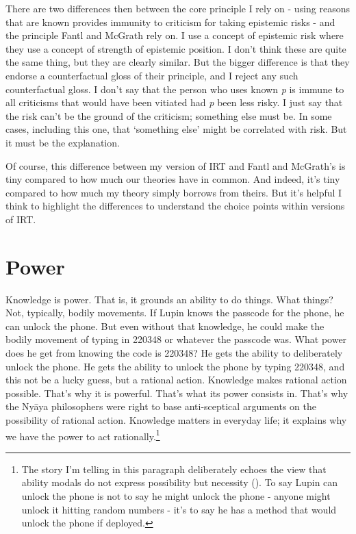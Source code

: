 \documentclass[
  12pt,
  letterpaper,
]{scrbook}
\begin{document}
There are two differences then between the core principle I rely on -
using reasons that are known provides immunity to criticism for taking
epistemic risks - and the principle Fantl and McGrath rely on. I use a
concept of epistemic risk where they use a concept of strength of
epistemic position. I don't think these are quite the same thing, but
they are clearly similar. But the bigger difference is that they endorse
a counterfactual gloss of their principle, and I reject any such
counterfactual gloss. I don't say that the person who uses known
\emph{p} is immune to all criticisms that would have been vitiated had
\emph{p} been less risky. I just say that the risk can't be the ground
of the criticism; something else must be. In some cases, including this
one, that `something else' might be correlated with risk. But it must be
the explanation.

Of course, this difference between my version of IRT and Fantl and
McGrath's is tiny compared to how much our theories have in common. And
indeed, it's tiny compared to how much my theory simply borrows from
theirs. But it's helpful I think to highlight the differences to
understand the choice points within versions of IRT.


\chapter{Power}\label{sec-power}

Knowledge is power. That is, it grounds an ability to do things. What
things? Not, typically, bodily movements. If Lupin knows the passcode
for the phone, he can unlock the phone. But even without that knowledge,
he could make the bodily movement of typing in 220348 or whatever the
passcode was. What power does he get from knowing the code is 220348? He
gets the ability to deliberately unlock the phone. He gets the ability
to unlock the phone by typing 220348, and this not be a lucky guess, but
a rational action. Knowledge makes rational action possible. That's why
it is powerful. That's what its power consists in. That's why the Nyāya
philosophers were right to base anti-sceptical arguments on the
possibility of rational action. Knowledge matters in everyday life; it
explains why we have the power to act rationally.\footnote{The story I'm
  telling in this paragraph deliberately echoes the view that ability
  modals do not express possibility but necessity
  (). To say Lupin can unlock the phone is not to say he might
  unlock the phone - anyone might unlock it hitting random numbers -
  it's to say he has a method that would unlock the phone if deployed.}
\end{document}

